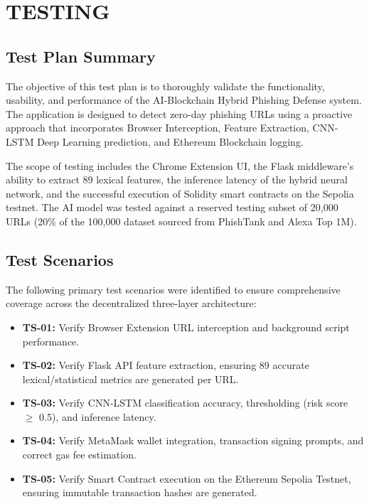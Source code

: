 
\chapter{TESTING}

\section{Test Plan Summary}
The objective of this test plan is to thoroughly validate the functionality, usability, and performance of the AI-Blockchain Hybrid Phishing Defense system. The application is designed to detect zero-day phishing URLs using a proactive approach that incorporates Browser Interception, Feature Extraction, CNN-LSTM Deep Learning prediction, and Ethereum Blockchain logging. 

The scope of testing includes the Chrome Extension UI, the Flask middleware's ability to extract 89 lexical features, the inference latency of the hybrid neural network, and the successful execution of Solidity smart contracts on the Sepolia testnet. The AI model was tested against a reserved testing subset of 20,000 URLs (20\% of the 100,000 dataset sourced from PhishTank and Alexa Top 1M).

\section{Test Scenarios}
The following primary test scenarios were identified to ensure comprehensive coverage across the decentralized three-layer architecture:
\begin{itemize}
    \item \textbf{TS-01:} Verify Browser Extension URL interception and background script performance.
    \item \textbf{TS-02:} Verify Flask API feature extraction, ensuring 89 accurate lexical/statistical metrics are generated per URL.
    \item \textbf{TS-03:} Verify CNN-LSTM classification accuracy, thresholding (risk score $\ge$ 0.5), and inference latency.
    \item \textbf{TS-04:} Verify MetaMask wallet integration, transaction signing prompts, and correct gas fee estimation.
    \item \textbf{TS-05:} Verify Smart Contract execution on the Ethereum Sepolia Testnet, ensuring immutable transaction hashes are generated.
\end{itemize}

